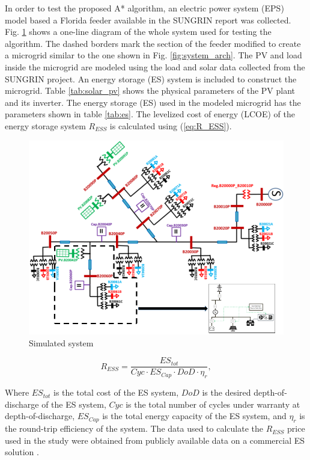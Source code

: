 In order to test the proposed A* algorithm, an electric power system (EPS) model based a Florida feeder available in the SUNGRIN report \cite{SUNGRIN} was collected. Fig. \ref{fig:simulation_grid} shows a one-line diagram of the whole system used for testing the algorithm. The dashed borders mark the section of the feeder modified to create a microgrid similar to the one shown in Fig. \ref{fig:system_arch}. The PV and load inside the microgrid are modeled using the load and solar data collected from the SUNGRIN project. An energy storage (ES) system is included to construct the microgrid. Table \ref{tab:solar_pv} shows the physical parameters of the PV plant and its inverter. The energy storage (ES) used in the modeled microgrid has the parameters shown in table \ref{tab:es}. The levelized cost of energy (LCOE)  of the energy storage system $R_{ESS}$ is calculated using (\ref{eq:R_ESS}).

\begin{figure}[!ht]
    \centering
    \includegraphics[width = 0.8\linewidth]{figs/A8/simulation_grid.png}
    \caption{Simulated system}
    \label{fig:simulation_grid}
\end{figure}


\begin{equation}
\label{eq:R_ESS}
R_{ESS} = \dfrac{ES_{tot}}{Cyc\cdot ES_{Cap}\cdot DoD\cdot \eta_{r}},
\end{equation}

Where $ES_{tot}$ is the total cost of the ES system, $DoD$ is the desired depth-of-discharge of the ES system, $Cyc$ is the total number of cycles under warranty at depth-of-discharge, $ES_{Cap}$ is the total energy capacity of the ES system, and $\eta_r$ is the round-trip efficiency of the system. The data used to calculate the $R_{ESS}$ price used in the study were obtained from publicly available data on a commercial ES solution \cite{tesla_powerpack_2018}. 

